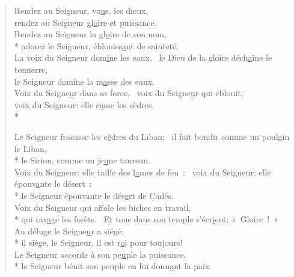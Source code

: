 
\begin{verse}
Rendez au Seigneur, vo\underline{u}s, les dieux, \\
rendez au Seigneur gl\underline{o}ire et puissance. \\

Rendez au Seigneur la gl\underline{o}ire de son nom, \\*
adorez le Seigneur, éblouiss\underline{a}nt de sainteté. \\

La voix du Seigneur dom\underline{i}ne les eaux,~\psalmdagger
le Dieu de la gloire déch\underline{a}îne le tonnerre, \\
le Seigneur domine la m\underline{a}sse des eaux. \\

Voix du Seigne\underline{u}r dans sa force,~\psalmdagger
voix du Seigne\underline{u}r qui éblouit, \\
voix du Seigneur: elle c\underline{a}sse les cèdres. \\*

Le Seigneur fracasse les c\underline{è}dres du Liban;~\psalmdagger
{}il fait bondir comme un poul\underline{a}in le Liban, \\*
le Sirion, comme un je\underline{u}ne taureau. \\

Voix du Seigneur: elle taille des l\underline{a}mes de feu ;~\psalmdagger
{}voix du Seigneur: elle épouv\underline{a}nte le désert ; \\*
le Seigneur épouvante le dés\underline{e}rt de Cadès. \\

Voix du Seigneur qui affole les biches en travail, \\*
qui rav\underline{a}ge les forêts.~\psalmstar
Et tous dans son temple s’écr\underline{i}ent: « Gloire ! » \\

Au déluge le Seigne\underline{u}r a siégé; \\*
il siège, le Seigneur, il est r\underline{o}i pour toujours! \\

Le Seigneur accorde à son pe\underline{u}ple la puissance, \\*
le Seigneur bénit son peuple en lui donn\underline{a}nt la paix. \\
\end{verse}

